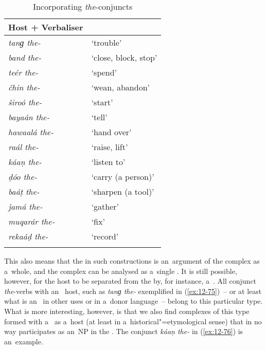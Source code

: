 \begin{table}[ht]
\caption{Incorporating \textit{the}-conjuncts}
\begin{tabularx}{.75\textwidth}{ l@{\hspace{45pt}} Q }
\lsptoprule
Host + Verbaliser &
\\\midrule
\textit{tanɡ the-} &
`trouble'\\
\textit{band the-} &
`close, block, stop'\\
\textit{teér the-} &
`spend'\\
\textit{čhin the-} &
`wean, abandon'\\
\textit{široó the-} &
`start'\\
\textit{bayaán the-} &
`tell'\\
\textit{hawaalá the-} &
`hand over'\\
\textit{raál the-} &
`raise, lift'\\
\textit{káaṇ the-} &
`listen to'\\
\textit{ḍóo the-} &
`carry (a person)'\\
\textit{baáṭ the-} &
`sharpen (a tool)'\\
\textit{ǰamá the-} &
`gather'\\
\textit{muqarár the-} &
`fix'\\
\textit{rekaáḍ the-} &
`record'\\\lspbottomrule
\end{tabularx}
\label{tab:12-3}
\end{table}


This also means that the  in such constructions is an~argument of the complex as a~whole, and the complex can be analysed as a~single . It is still possible, however, for the host to be separated from the  by, for instance, a~. All conjunct \textit{the}-verbs with an~ host, such as \textit{tanɡ the-} exemplified in (\ref{ex:12-75})~-- or at least what is an~ in other uses or in a~donor language~-- belong to this particular type. What is more interesting, however, is that we also find complexes of this type formed with a~ as a~host (at least in a~historical"=etymological sense) that in no way participates as an~NP in the . The conjunct \textit{káaṇ the-} in (\ref{ex:12-76}) is an~example. 


\noindent
{}

